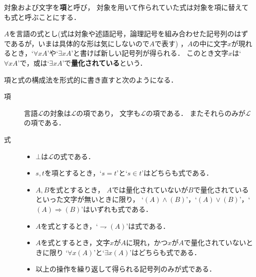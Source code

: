 	
	対象および文字を{\bf 項}と呼び，
	対象を用いて作られていた式は対象を項に替えても式と呼ぶことにする．
	
	$A$を言語の式とし(式は対象や述語記号，論理記号を組み合わせた記号列のはずであるが，いまは具体的な形は気にしないので$A$で表す)
	，$A$の中に文字$x$が現れるとき，`$\forall x A$'や`$\exists x A$'と書けば新しい記号列が得られる．
	このとき文字$x$は`$\forall x A$'で，或は`$\exists x A$'で{\bf 量化されている}という．
	
	項と式の構成法を形式的に書き直すと次のようになる．
	\begin{description}
		\item[項] 言語$\mathcal{L}$の対象は$\mathcal{L}$の項であり，
			文字も$\mathcal{L}$の項である．
			またそれらのみが$\mathcal{L}$の項である．
			
		\item[式] 
			\begin{itemize}
				\item $\bot$は$\mathcal{L}$の式である．
				
				\item $s,t$を項とするとき，`$s=t$'と`$s \in t$'はどちらも式である．
					
				\item $A,B$を式とするとき，
					$A$では量化されていないが$B$で量化されているといった文字が無いときに限り，
					`$(A) \wedge (B)$'，`$(A) \vee (B)$'，`$(A) \Longrightarrow (B)$'はいずれも式である．
				
				\item $A$を式とするとき，`$\rightharpoondown (A)$'は式である．
				
				\item $A$を式とするとき，文字$x$が$A$に現れ，かつ$x$が$A$で量化されていないときに限り
					`$\forall x (A)$'と`$\exists x (A)$'はどちらも式である．
				
				\item 以上の操作を繰り返して得られる記号列のみが式である．
			\end{itemize}
	\end{description}
	
